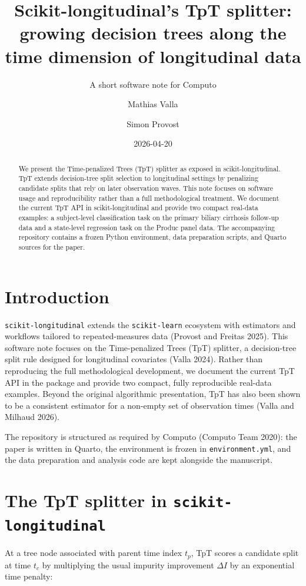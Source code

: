\documentclass[
  letterpaper,
  DIV=11,
  numbers=noendperiod]{scrartcl}
\title{Scikit-longitudinal's TpT splitter: growing decision trees along
the time dimension of longitudinal data}
\subtitle{A short software note for Computo}
\author{Mathias Valla \and Simon Provost}
\date{2026-04-20}
\begin{document}
\maketitle
\begin{abstract}
We present the Time-penalized Trees (TpT) splitter as exposed in
scikit-longitudinal. TpT extends decision-tree split selection to
longitudinal settings by penalizing candidate splits that rely on later
observation waves. This note focuses on software usage and
reproducibility rather than a full methodological treatment. We document
the current TpT API in scikit-longitudinal and provide two compact
real-data examples: a subject-level classification task on the primary
biliary cirrhosis follow-up data and a state-level regression task on
the Produc panel data. The accompanying repository contains a frozen
Python environment, data preparation scripts, and Quarto sources for the
paper.
\end{abstract}


\section{Introduction}\label{introduction}

\texttt{scikit-longitudinal} extends the \texttt{scikit-learn} ecosystem
with estimators and workflows tailored to repeated-measures data
(Provost and Freitas 2025). This software note focuses on the
Time-penalized Trees (TpT) splitter, a decision-tree split rule designed
for longitudinal covariates (Valla 2024). Rather than reproducing the
full methodological development, we document the current TpT API in the
package and provide two compact, fully reproducible real-data examples.
Beyond the original algorithmic presentation, TpT has also been shown to
be a consistent estimator for a non-empty set of observation times
(Valla and Milhaud 2026).

The repository is structured as required by Computo (Computo Team 2020):
the paper is written in Quarto, the environment is frozen in
\texttt{environment.yml}, and the data preparation and analysis code are
kept alongside the manuscript.

\section{\texorpdfstring{The TpT splitter in
\texttt{scikit-longitudinal}}{The TpT splitter in scikit-longitudinal}}\label{the-tpt-splitter-in-scikit-longitudinal}

At a tree node associated with parent time index \(t_p\), TpT scores a
candidate split at time \(t_c\) by multiplying the usual impurity
improvement \(\Delta I\) by an exponential time penalty:
\end{document}
